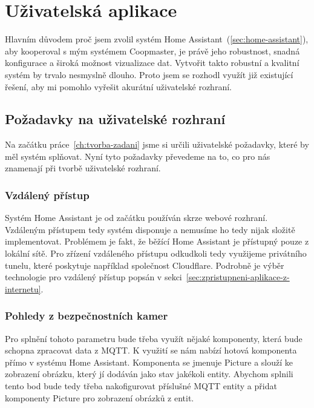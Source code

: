 \section{Uživatelská aplikace}\label{sec:tvorba-gui-rozhrani}
Hlavním důvodem proč jsem zvolil systém Home Assistant~(\ref{sec:home-assistant}), aby kooperoval s mým systémem Coopmaster, je právě jeho robustnost, snadná konfigurace a široká možnost vizualizace dat.
Vytvořit takto robustní a kvalitní systém by trvalo nesmyslně dlouho.
Proto jsem se rozhodl využít již existující řešení, aby mi pomohlo vyřešit akurátní uživatelské rozhraní.

\subsection*{Požadavky na uživatelské rozhraní}
Na začátku práce~\ref{ch:tvorba-zadani} jsme si určili uživatelské požadavky, které by měl systém splňovat.
Nyní tyto požadavky převedeme na to, co pro nás znamenají při tvorbě uživatelské rozhraní.

\subsubsection*{Vzdálený přístup}
Systém Home Assistant je od začátku používán skrze webové rozhraní.
Vzdáleným přístupem tedy systém disponuje a nemusíme ho tedy nijak složitě implementovat.
Problémem je fakt, že běžící Home Assistant je přístupný pouze z lokální sítě.
Pro zřízení vzdáleného přístupu odkudkoli tedy využijeme privátního tunelu, které poskytuje například společnost Cloudflare.
Podrobně je výběr technologie pro vzdálený přístup popsán v sekci~\ref{sec:zpristupneni-aplikace-z-internetu}.

\subsubsection*{Pohledy z bezpečnostních kamer}
Pro splnění tohoto parametru bude třeba využít nějaké komponenty, která bude schopna zpracovat data z MQTT.
K využití se nám nabízí hotová komponenta přímo v systému Home Assistant.
Komponenta se jmenuje Picture a slouží ke zobrazení obrázku, který jí dodáván jako stav jakékoli entity.\newline
Abychom splnili tento bod bude tedy třeba nakofigurovat příslušné MQTT entity a přidat komponenty Picture pro zobrazení obrázků z entit.

